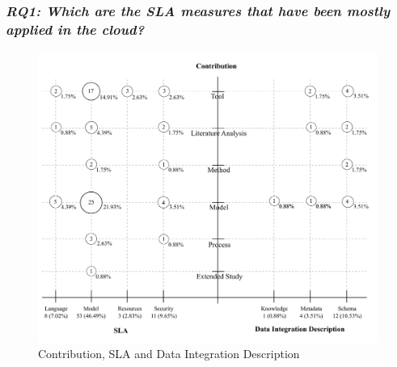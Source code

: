 
 
\subsubsection{\textit{RQ1: Which are the SLA measures that have been mostly applied  in the cloud?}}
\begin{figure}[h!]
\centering 
\includegraphics[width=0.99\textwidth]{figs/bubble-charts/Contribution-SLA-DIdescription.pdf}

\caption{Contribution, SLA and Data Integration Description}\label{fig:facet1}
\end{figure}


